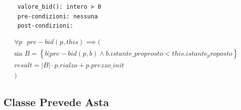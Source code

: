 \documentclass{article}
\begin{document}
\begin{lstlisting}
    valore_bid(): intero > 0
    pre-condizioni: nessuna
    post-condizioni:
\end{lstlisting}

\begin{equation}
    \begin{gathered}
    \forall p \text{ } pre-bid(p,this) \implies (\\
        \text{sia } B = \left\{b | pre-bid(p,b) \land b.istante\_proprosto < this.istante_proposto \right\}\\
        result = |B| \cdot p.rialzo + p.prezzo\_init\\
        )
    \end{gathered}
\end{equation}

\subsection{Classe Prevede Asta}
\end{document}
